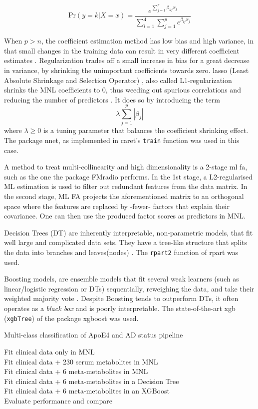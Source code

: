 \documentclass{amsart}
\begin{document}
\[\textrm{Pr}(y=k|X=x) =  \dfrac{e^{\sum_{j=1}^{p}\beta_{kj}x_j}}{\sum_{l=1}^{4}\sum_{j=1}^{p}e^{\beta_{lj}x_j}}\]

When $p > n$, the coefficient estimation method has low bias and high variance, in that small changes in the training data can result in very different coefficient estimates \cite{James2023AnEdition}. Regularization trades off a small increase in bias for a great decrease in variance, by shrinking the unimportant coefficients towards zero. \acrshort{lasso} (Least Absolute Shrinkage and Selection Operator) \cite{Tibshiranit1996RegressionLasso}, also called L1-regularization shrinks the MNL coefficients to 0, thus weeding out spurious correlations and reducing the number of predictors \cite{Tibshiranit1996RegressionLasso}. It does so by introducing the term  \[\lambda\sum_{j=1}^{p}|\beta_j|\] where $\lambda \geq 0$ is a tuning parameter that balances the coefficient shrinking effect. The package \textsf{nnet}, as implemented in \textsf{caret}'s \texttt{train} function was used in this case.

A method to treat multi-collinearity and high dimensionality is a 2-stage \acrfull{ml} \acrfull{fa}, such as the one the package \textsf{FMradio} \cite{Peeters2019StableData} performs. In the 1st stage, a L2-regularised ML estimation is used to filter out redundant features from the data matrix. In the second stage, ML FA projects the aforementioned matrix to an orthogonal space where the features are replaced by -fewer- factors that explain their covariance. One can then use the produced factor scores as predictors in MNL.

Decision Trees (DT) are inherently interpretable, non-parametric models, that fit well large and complicated data sets. They have a tree-like structure that splits the data into branches and leaves(nodes) \cite{Song2015DecisionPrediction}. The \texttt{rpart2} \cite{rpart} function of \textsf{rpart} was used.

Boosting models, are ensemble models that fit several weak learners (such as linear/logistic regression or DTs) sequentially, reweighing the data, and take their weighted majority vote \cite{Friedman2000boosting,Friedman2001gbm}. Despite Boosting tends to outperform DTs, it often operates as a \textit{black box} and is poorly interpretable. The state-of-the-art \acrlong{xgb} (\texttt{xgbTree}) of the package \textsf{xgboost} \cite{Chen2016XGBoost:System} was used.

\begin{algorithm}
\caption{Multi-class classification of ApoE4 and AD status pipeline} \label{alg:classification}
    Fit clinical data only in MNL\\
    Fit clinical data + 230 serum metabolites in MNL\\
    Fit clinical data + 6 meta-metabolites in MNL\\
    Fit clinical data + 6 meta-metabolites in a Decision Tree\\
    Fit clinical data + 6 meta-metabolites in an XGBoost\\
    Evaluate performance and compare
\end{algorithm}
\end{document}
